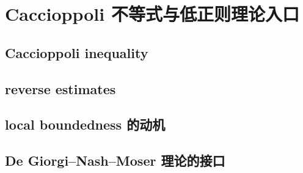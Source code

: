 \section{Caccioppoli 不等式与低正则理论入口}
\label{b2:sec:1604}


\subsection{Caccioppoli inequality}
\label{b2:subsec:160401}

\subsection{reverse estimates}
\label{b2:subsec:160402}

\subsection{local boundedness 的动机}
\label{b2:subsec:160403}

\subsection{De Giorgi–Nash–Moser 理论的接口}
\label{b2:subsec:160404}


